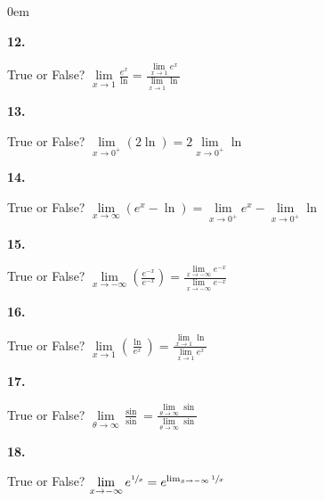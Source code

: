 \documentclass[12pt,]{book}
\theoremstyle{plain}
\theoremstyle{definition}
\numberwithin{equation}{section}
\newenvironment{exercisegroup}%
{\medskip\noindent}%
{\par\bigskip}%
\newlength{\exercisegroupindent}%
\newlength{\exercisegroupitemwidth}%
\newenvironment{exercisegrouplist}%
{\vspace{-\partopsep}%
\begin{adjustwidth}{\exercisegroupindent}{0em}}%
{\end{adjustwidth}%
\vspace{-\partopsep}%
\vspace{\baselineskip}}%
\newenvironment{exercisegroupbycol}[1]%
{\begin{exercisegrouplist}%
\vspace{-\multicolsep}%
\begin{multicols}{#1}%
\setlength{\parindent}{0em}%
\setlength{\exercisegroupitemwidth}{\linewidth}}%
{\end{multicols}%
\vspace{-\multicolsep}%
\end{exercisegrouplist}}%
\newenvironment{exercisegroupitem}[1]%
{\begin{minipage}[t]{\exercisegroupitemwidth}
\vspace{0pt}%
{\bfseries#1}%
\rule{0pt}{\baselineskip}}{\strut%
\end{minipage}%
\hspace{\columnsep}}%
\providecommand\phantomsection{}
\newcommand{\fe}[2]{\mathop{{#1}{\left(#2\right)}}}
\begin{document}
\begin{exerciselist}
\begin{exercisegroup}
\begin{exercisegroupbycol}{1}
\par%
\begin{exercisegroupitem}{12. }\phantomsection\hypertarget{exercise-85}{\null}
True or False? \(\lim\limits_{x\to1}\frac{e^x}{\fe{\ln}{x}}=\frac{\lim\limits_{x\to1}e^x}{\lim\limits_{x\to1}\fe{\ln}{x}}\)%
\end{exercisegroupitem}%
\par%
\begin{exercisegroupitem}{13. }\phantomsection\hypertarget{exercise-86}{\null}
True or False? \(\lim\limits_{x\to0^{+}}\left(2\fe{\ln}{x}\right)=2\lim\limits_{x\to0^{+}}\fe{\ln}{x}\)%
\end{exercisegroupitem}%
\par%
\begin{exercisegroupitem}{14. }\phantomsection\hypertarget{exercise-87}{\null}
True or False? \(\lim\limits_{x\to\infty}\left(e^x-\fe{\ln}{x}\right)=\lim\limits_{x\to0^{+}}e^x-\lim\limits_{x\to0^{+}}\fe{\ln}{x}\)%
\end{exercisegroupitem}%
\par%
\begin{exercisegroupitem}{15. }\phantomsection\hypertarget{exercise-88}{\null}
True or False? \(\lim\limits_{x\to-\infty}\left(\frac{e^{-x}}{e^{-x}}\right)=\frac{\lim\limits_{x\to-\infty}e^{-x}}{\lim\limits_{x\to-\infty}e^{-x}}\)%
\end{exercisegroupitem}%
\par%
\begin{exercisegroupitem}{16. }\phantomsection\hypertarget{exercise-89}{\null}
True or False? \(\lim\limits_{x\to1}\left(\frac{\fe{\ln}{x}}{e^x}\right)=\frac{\lim\limits_{x\to1}\fe{\ln}{x}}{\lim\limits_{x\to1}e^x}\)%
\end{exercisegroupitem}%
\par%
\begin{exercisegroupitem}{17. }\phantomsection\hypertarget{exercise-90}{\null}
True or False? \(\lim\limits_{\theta\to\infty}\frac{\fe{\sin}{\theta}}{\fe{\sin}{\theta}}=\frac{\lim\limits_{\theta\to\infty}\fe{\sin}{\theta}}{\lim\limits_{\theta\to\infty}\fe{\sin}{\theta}}\)%
\end{exercisegroupitem}%
\par%
\begin{exercisegroupitem}{18. }\phantomsection\hypertarget{exercise-hear-me-last}{\null}
True or False? \(\lim\limits_{x\to-\infty}e^{\sfrac{1}{x}}=e^{\lim_{x\to-\infty}\sfrac{1}{x}}\)%
\end{exercisegroupitem}%
\par%

\end{exercisegroupbycol}
\end{exercisegroup}
\end{exerciselist}
\end{document}
